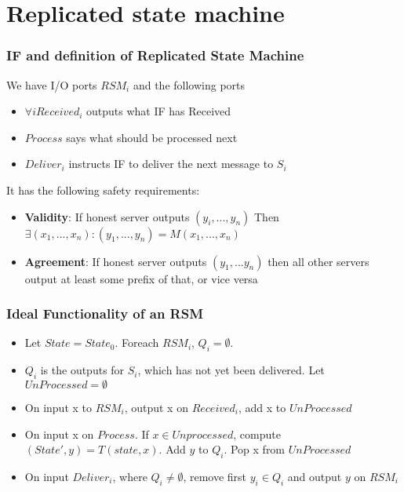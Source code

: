 \section{Replicated state machine}
        \begin{frame}
            \frametitle{IF and definition of Replicated State Machine}
                We have I/O ports $RSM_i$ and the following ports
                \begin{itemize}
                    \item $\forall i Received_i$ outputs what IF has Received
                    \item $Process$ says what should be processed next
                    \item $Deliver_i$ instructs IF to deliver the next message to $S_i$
                \end{itemize}
                It has the following safety requirements:
                    \begin{itemize}
                        \item \textbf{Validity}: If honest server outputs $(y_i, ..., y_n)$ Then $\exists (x_1, ..., x_n) : (y_1, ..., y_n) = M(x_1, ..., x_n)$
                        \item \textbf{Agreement}: If honest server outputs $(y_1, ... y_n)$ then all other servers output at least some prefix of that, or vice versa
                    \end{itemize}
        \end{frame}
    \begin{frame}
        \frametitle{Ideal Functionality of an RSM}
            \begin{itemize}
                \item Let $State = State_0$. Foreach $RSM_i$, $Q_i = \emptyset$. 
                \item $Q_i$ is the outputs for $S_i$, which has not yet been delivered. Let $UnProcessed = \emptyset$
                \item On input x to $RSM_i$, output x on $Received_i$, add x to $UnProcessed$
                \item On input x on $Process$. If $x \in Unprocessed$, compute $(State', y) = T(state, x)$. Add $y$ to $Q_i$. Pop x from $UnProcessed$
                \item On input $Deliver_i$, where $Q_i \neq \emptyset$, remove first $y_i \in Q_i$ and output $y$ on $RSM_i$
            \end{itemize}
    \end{frame}
